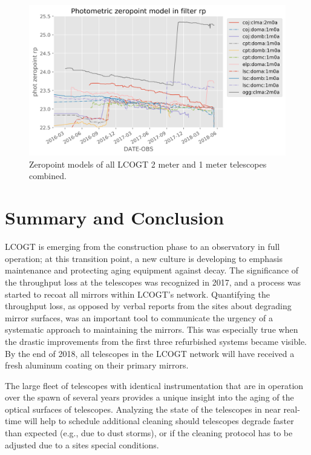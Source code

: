 \documentclass[draft]{spieman}
\begin{document}
\begin{figure}
\includegraphics[width=\textwidth]{images/allmodels__2m0a_1m0a__rp.png}
\caption{\label{fig_alltelescopes} Zeropoint models of all LCOGT 2 meter and 1 meter telescopes combined. }
\end{figure}


\section{Summary and Conclusion}
LCOGT is emerging from the construction phase to an observatory in full operation; at this
transition point, a new culture is developing to emphasis maintenance and protecting aging equipment
against decay. The significance of the throughput loss at the telescopes was recognized in 2017, and
a process was started to recoat all mirrors within LCOGT's network. Quantifying the throughput loss,
as opposed by verbal reports from the sites about degrading mirror surfaces, was an important tool
to communicate the urgency of a systematic approach to maintaining the mirrors. This was especially
true when the drastic improvements from the first three refurbished systems became visible. By the
end of 2018, all telescopes in the LCOGT network will have received a fresh aluminum coating on
their primary mirrors.

The large fleet of telescopes with identical instrumentation that are in operation over the spawn 
of several years provides a unique insight into the aging of the optical surfaces of  
telescopes. Analyzing the state of the telescopes in near real-time will help to schedule 
additional cleaning should telescopes degrade faster than expected (e.g., due to dust storms), or 
if the cleaning protocol has to be adjusted due to a sites special conditions.     
\end{document}
